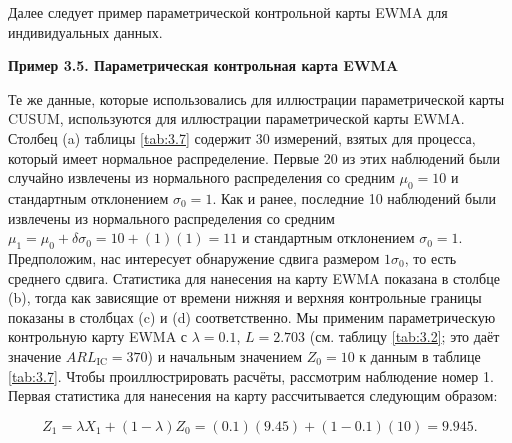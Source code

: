 Далее следует пример параметрической контрольной карты EWMA для индивидуальных данных.

\noindent\textbf{Пример 3.5. Параметрическая контрольная карта EWMA}

Те же данные, которые использовались для иллюстрации параметрической карты CUSUM, используются для иллюстрации параметрической карты EWMA. Столбец (a) таблицы \ref{tab:3.7} содержит 30 измерений, взятых для процесса, который имеет нормальное распределение. Первые 20 из этих наблюдений были случайно извлечены из нормального распределения со средним \(\mu_0 = 10\) и стандартным отклонением \(\sigma_0 = 1\). Как и ранее, последние 10 наблюдений были извлечены из нормального распределения со средним \(\mu_1 = \mu_0 + \delta\sigma_0 = 10 + (1)(1) = 11\) и стандартным отклонением \(\sigma_0 = 1\). Предположим, нас интересует обнаружение сдвига размером \(1\sigma_0\), то есть среднего сдвига. Статистика для нанесения на карту EWMA показана в столбце (b), тогда как зависящие от времени нижняя и верхняя контрольные границы показаны в столбцах (c) и (d) соответственно. Мы применим параметрическую контрольную карту EWMA с \(\lambda = 0.1\), \(L = 2.703\) (см. таблицу \ref{tab:3.2}; это даёт значение \(ARL_{\text{IC}} = 370\)) и начальным значением \(Z_0 = 10\) к данным в таблице \ref{tab:3.7}. Чтобы проиллюстрировать расчёты, рассмотрим наблюдение номер 1. Первая статистика для нанесения на карту рассчитывается следующим образом:

\[
Z_1 = \lambda X_1 + (1 - \lambda)Z_0 = (0.1)(9.45) + (1 - 0.1)(10) = 9.945.
\]

